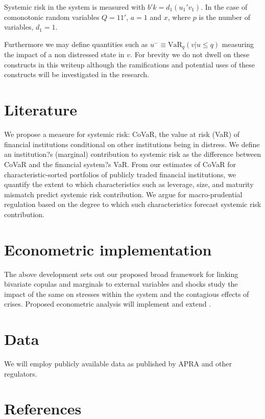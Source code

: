 \documentclass[authoryear]{elsarticle}
\newcommand{\var}{\ensuremath{\mathrm{VaR}}}
\begin{document}
Systemic risk in the system is measured with $b'k=d_1(u_1'v_1)$.   In the case of comonotonic  random variables $Q=11'$, $a=1$ and $x$, where $p$ is the number of variables,  $d_1=1$. 
 
Furthermore we may define quantities such as
$
u^- \equiv \var_q(v|u\le q)
$
measuring the impact of a non distressed state in $v$.  For brevity we do not dwell on these constructs in this writeup although the ramifications and potential uses of these constructs will be  investigated in the research.

\section{Literature}

We propose a measure for systemic risk: CoVaR, the value at risk (VaR) of financial institutions conditional on other institutions being in distress. We define an institution?s (marginal) contribution to systemic risk as the difference between CoVaR and the financial system?s VaR. From our estimates of CoVaR for characteristic-sorted portfolios of publicly traded financial institutions, we quantify the extent to which characteristics such as leverage, size, and maturity mismatch predict systemic risk contribution. We argue for macro-prudential regulation based on the degree to which such characteristics forecast systemic risk contribution.

\section{Econometric implementation}

The above development sets out our proposed  broad  framework for linking bivariate copulas and marginals to external variables and shocks study the impact of the same on stresses within the system and the contagious effects of crises.   Proposed econometric analysis will implement and extend  \cite{brownlees2010volatility}.

\section{Data}

We will employ publicly available data as published by APRA and other regulators.

\section*{References}

\end{document}
